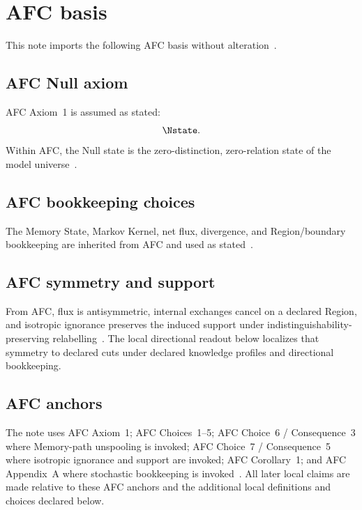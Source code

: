\section{AFC basis}

This note imports the following AFC basis without alteration~\cite{AFCStokes2025,AF2025}.

\subsection{AFC Null axiom}
AFC Axiom~1 is assumed as stated:
\[
  \Nstate.
\]
Within AFC, the Null state is the zero-distinction, zero-relation state of the model universe~\cite{AFCStokes2025}.

\subsection{AFC bookkeeping choices}
The Memory State, Markov Kernel, net flux, divergence, and Region/boundary bookkeeping are inherited from AFC and used as stated~\cite{AFCStokes2025}.

\subsection{AFC symmetry and support}
From AFC, flux is antisymmetric, internal exchanges cancel on a declared Region, and isotropic ignorance preserves the induced support under indistinguishability-preserving relabelling~\cite{AFCStokes2025}. The local directional readout below localizes that symmetry to declared cuts under declared knowledge profiles and directional bookkeeping.

\subsection{AFC anchors}
The note uses AFC Axiom~1; AFC Choices~1--5; AFC Choice~6 / Consequence~3 where Memory-path unspooling is invoked; AFC Choice~7 / Consequence~5 where isotropic ignorance and support are invoked; AFC Corollary~1; and AFC Appendix~A where stochastic bookkeeping is invoked~\cite{AFCStokes2025}. All later local claims are made relative to these AFC anchors and the additional local definitions and choices declared below.
